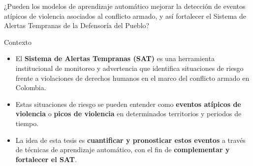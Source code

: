

\begin{frame}{}
    \vspace{3cm}
    \centering
    \Large ¿Pueden los \alert{modelos de aprendizaje automático} mejorar la detección de \alert{eventos atípicos de violencia} asociados al conflicto armado, y así fortalecer el \alert{Sistema de Alertas Tempranas} de la Defensoría del Pueblo?

\end{frame}

\begin{frame}{Contexto}
    \begin{itemize}
        \item El \textbf{Sistema de Alertas Tempranas (SAT)} es una herramienta institucional de monitoreo y advertencia que identifica situaciones de riesgo frente a violaciones de derechos humanos en el marco del conflicto armado en Colombia.
        
        \vspace{0.4cm}
        \item Estas situaciones de riesgo se pueden entender como \textbf{eventos atípicos de violencia} o \textbf{picos de violencia} en determinados territorios y periodos de tiempo.
        
        \vspace{0.4cm}
        \item La idea de esta tesis es \textbf{cuantificar y pronosticar estos eventos} a través de técnicas de aprendizaje automático, con el fin de \textbf{complementar y fortalecer el SAT}.
    \end{itemize}
\end{frame}